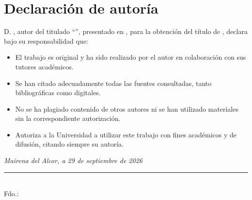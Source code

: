 \chapter*{Declaración de autoría}

\vspace{1em}

D. \textbf{\memAutor}, autor del \memTipoTrabajo{}
titulado \enquote{\memTitulo}, presentado
en \memCiudad, \memFecha{} para la obtención del título de
\memTitulacion, declara bajo su responsabilidad que:

\vspace{0.5em}

\begin{itemize}
  \item El trabajo es original y ha sido realizado por el autor en
        colaboración con sus tutores académicos.
  \item Se han citado adecuadamente todas las fuentes consultadas, tanto
        bibliográficas como digitales.
  \item No se ha plagiado contenido de otros autores ni se han utilizado
        materiales sin la correspondiente autorización.
  \item Autoriza a la Universidad a utilizar este trabajo con fines
        académicos y de difusión, citando siempre su autoría.
\end{itemize}

\vspace{2em}

\begin{flushright}
\textit{Mairena del Alcor, a 29 de septiembre de 2026}\\[3em]

\rule{6cm}{0.4pt}\\
Fdo.: \memAutor
\end{flushright}

